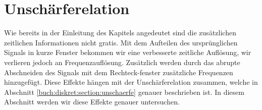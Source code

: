 %
%
%
%
\section{Unschärferelation
\label{sonogramm:section:teil1}}
Wie bereits in der Einleitung des Kapitels angedeutet sind die zusätzlichen
zeitlichen Informationen nicht gratis. 
Mit dem Aufteilen des ursprünglichen Signals in kurze Fenster bekommen wir eine
verbesserte zeitliche Auflösung, wir verlieren jedoch an Frequenzauflösung.
Zusätzlich werden durch das abrupte Abschneiden des Signals mit dem Rechteck-fenster
zusätzliche Frequenzen hinzugefügt. 
Diese Effekte hängen mit der Unschärferelation zusammen, welche in Abschnitt
\ref{buch:diskret:section:unschaerfe} genauer beschrieben ist.
In diesem Abschnitt werden wir diese Effekte genauer untersuchen.
